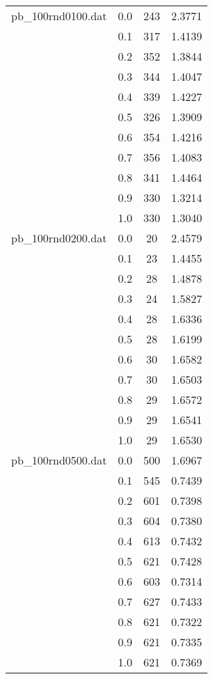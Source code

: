 \documentclass[12pt]{article}
\begin{document}
\begin{longtable}{|c|c|c|c|}
      \hline
      
      pb_100rnd0100.dat & 0.0 & 243 & 2.3771 \\
      & 0.1 & 317 & 1.4139 \\
      & 0.2 & 352 & 1.3844 \\
      & 0.3 & 344 & 1.4047 \\
      & 0.4 & 339 & 1.4227 \\
      & 0.5 & 326 & 1.3909 \\
      & 0.6 & 354 & 1.4216 \\
      & 0.7 & 356 & 1.4083 \\
      & 0.8 & 341 & 1.4464 \\
      & 0.9 & 330 & 1.3214 \\
      & 1.0 & 330 & 1.3040 \\
      
      \hline
      
      pb_100rnd0200.dat & 0.0 & 20 & 2.4579 \\
      & 0.1 & 23 & 1.4455 \\
      & 0.2 & 28 & 1.4878 \\
      & 0.3 & 24 & 1.5827 \\
      & 0.4 & 28 & 1.6336 \\
      & 0.5 & 28 & 1.6199 \\
      & 0.6 & 30 & 1.6582 \\
      & 0.7 & 30 & 1.6503 \\
      & 0.8 & 29 & 1.6572 \\
      & 0.9 & 29 & 1.6541 \\
      & 1.0 & 29 & 1.6530 \\
      
      \hline
      
      pb_100rnd0500.dat & 0.0 & 500 & 1.6967 \\
      & 0.1 & 545 & 0.7439 \\
      & 0.2 & 601 & 0.7398 \\
      & 0.3 & 604 & 0.7380 \\
      & 0.4 & 613 & 0.7432 \\
      & 0.5 & 621 & 0.7428 \\
      & 0.6 & 603 & 0.7314 \\
      & 0.7 & 627 & 0.7433 \\
      & 0.8 & 621 & 0.7322 \\
      & 0.9 & 621 & 0.7335 \\
      & 1.0 & 621 & 0.7369 \\
      

\end{longtable}
\end{document}
